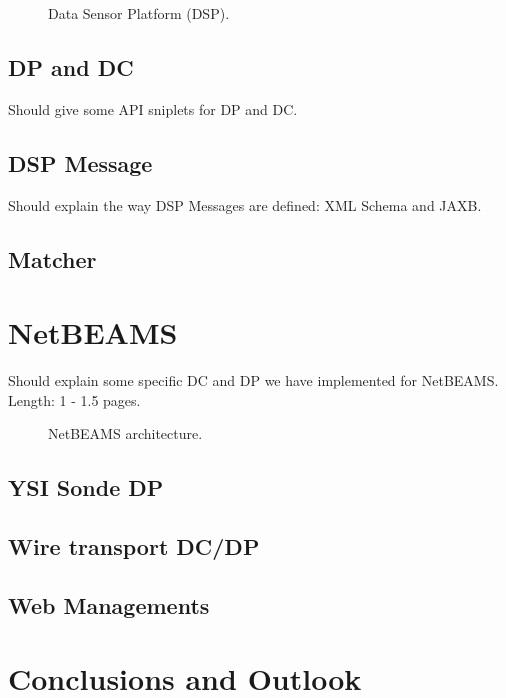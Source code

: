 \documentclass[conference]{IEEEtran}
\begin{document}
\begin{figure}
\centering
{}
\caption{\label{FIG_DSP} Data Sensor Platform (DSP).}
\end{figure}

\subsection{DP and DC}

Should give some API sniplets for DP and DC.

\subsection{DSP Message}

Should explain the way DSP Messages are defined: XML Schema and JAXB.

\subsection{Matcher}


\section{NetBEAMS}

Should explain some specific DC and DP we have implemented for
NetBEAMS. Length: 1 - 1.5 pages.

\begin{figure*}
\centering
{}
\caption{\label{FIG_NETBEAMS} NetBEAMS architecture.}
\end{figure*}

\subsection{YSI Sonde DP}

\subsection{Wire transport DC/DP}

\subsection{Web Managements}


\section{Conclusions and Outlook}
\end{document}
